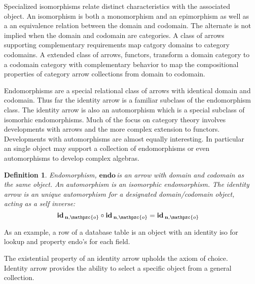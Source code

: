 \documentclass[aps,twocolumn,secnumarabic,nobalancelastpage,amsmath,amssymb,
amsthm,nofootinbib,parskip=full]{revtex4}
\numberwithin{equation}{section}
\newtheorem{definition}{Definition}[section]
\newcommand{\subp}[1]{\mathbf{#1}}
\newcommand{\obk}[1]{\mathpzc{#1}}
\newcommand{\oarrid}[2]{\oper{id}_{\subp{#1},\obk{#2}}}
\newcommand{\oper}[1]{\mathbf{#1}\,}
\begin{document}
Specialized isomorphisms relate distinct characteristics
with the associated object.
An isomorphism is both a
monomorphism and an epimorphism as well as a an
equivalence relation between the domain and codomain.
The alternate is not implied 
when the domain and codomain are categories.
A class of arrows supporting complementary requirements
map catgory domains to category codomains.
A extended class of arrows, functors,
transform a domain category
to a codomain category with complementary behavior
to map the compositional
properties of category arrow collections from domain to codomain.

Endomorphisms are a special relational class of arrows with
identical domain and codomain.
Thus far the identity arrow is a familiar subclass of the endomorphism class.
The identity arrow is also an automorphism which is a special subclass of
isomorhic endomorphisms. Much of the focus on category theory involves
developments with arrows and the more complex extension to functors.
Developments with automorphisms are almost equally interesting.
In particular an single object may support a collection of endomorphisms
or even automorphisms to develop complex algebras.

\begin{definition}{Endomorphism, $\oper{endo}$}\label{def:endomorphism}
  is an arrow with domain and codomain as the same object.
  An automorphism is an isomorphic endomorphism.
  The identity arrow is an unique automorphism for a designated
  domain/codomain object, acting as a self inverse:
\begin{equation*}
\oarrid{n}{o}\circ\oarrid{n}{o}=\oarrid{n}{o}
\end{equation*}
\end{definition}

As an example, a row of a
database table is an object with an identity iso for
lookup and property endo's for each field. 

The existential property of an identity arrow upholds
the axiom of choice. Identity arrow provides the ability to
select a specific object from a general collection.
\end{document}
